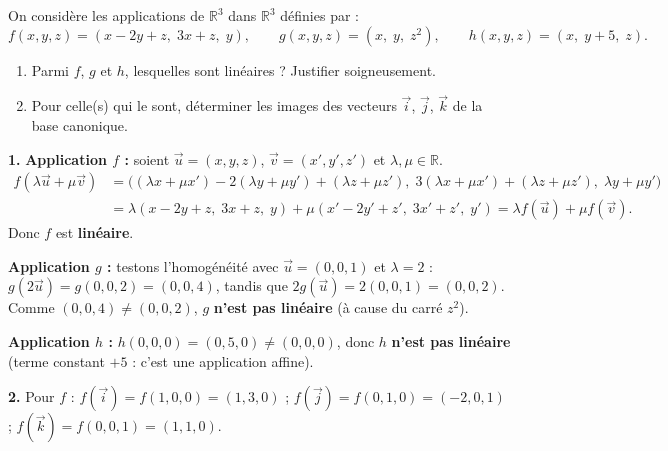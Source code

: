 \documentclass[11pt]{article}
\begin{document}
\begin{exercice}
On considère les applications de $\mathbb{R}^3$ dans $\mathbb{R}^3$ définies par :
\[ f(x, y, z) = (x - 2y + z,\; 3x + z,\; y), \qquad g(x, y, z) = (x,\; y,\; z^2), \qquad h(x, y, z) = (x,\; y + 5,\; z). \]
\begin{enumerate}
\item Parmi $f$, $g$ et $h$, lesquelles sont linéaires ? Justifier soigneusement.
\item Pour celle(s) qui le sont, déterminer les images des vecteurs $\vec{i}$, $\vec{j}$, $\vec{k}$ de la base canonique.
\end{enumerate}
\end{exercice}

\begin{corrige}[Exercice 1]
\textbf{1.} \textbf{Application $f$ :} soient $\vec{u} = (x, y, z)$, $\vec{v} = (x', y', z')$ et $\lambda, \mu \in \mathbb{R}$.
\begin{align*}
f(\lambda \vec{u} + \mu \vec{v}) &= \big( (\lambda x + \mu x') - 2(\lambda y + \mu y') + (\lambda z + \mu z'),\; 3(\lambda x + \mu x') + (\lambda z + \mu z'),\; \lambda y + \mu y' \big) \\
&= \lambda (x - 2y + z,\; 3x + z,\; y) + \mu (x' - 2y' + z',\; 3x' + z',\; y') = \lambda f(\vec{u}) + \mu f(\vec{v}).
\end{align*}
Donc $f$ est \textbf{linéaire}.

\textbf{Application $g$ :} testons l'homogénéité avec $\vec{u} = (0, 0, 1)$ et $\lambda = 2$ : $g(2\vec{u}) = g(0, 0, 2) = (0, 0, 4)$, tandis que $2 g(\vec{u}) = 2(0, 0, 1) = (0, 0, 2)$. Comme $(0,0,4) \neq (0,0,2)$, $g$ \textbf{n'est pas linéaire} (à cause du carré $z^2$).

\textbf{Application $h$ :} $h(0, 0, 0) = (0, 5, 0) \neq (0, 0, 0)$, donc $h$ \textbf{n'est pas linéaire} (terme constant $+5$ : c'est une application affine).

\textbf{2.} Pour $f$ : $f(\vec{i}) = f(1, 0, 0) = (1, 3, 0)$ ; $f(\vec{j}) = f(0, 1, 0) = (-2, 0, 1)$ ; $f(\vec{k}) = f(0, 0, 1) = (1, 1, 0)$.
\end{corrige}
\end{document}
